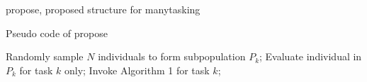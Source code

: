 \begin{frame}{\gls{propose}, proposed structure for manytasking}
    \begin{algorithm}[H]
        \caption{Pseudo code of \gls{propose}}
        \begin{algorithmic}[1]
                \State Randomly sample $N$ individuals to form subpopulation $P_k$;
                \State Evaluate individual in $P_k$ for task $k$ only;
            \EndFor
                    \State Invoke Algorithm 1 for task $k$;
                \EndFor
            \EndWhile
        \end{algorithmic}
    \end{algorithm}
\end{frame}
